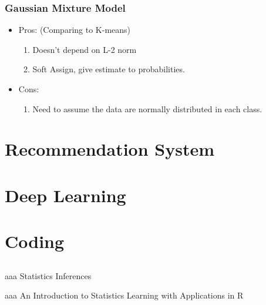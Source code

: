 \documentclass[12pt]{amsart}
\numberwithin{equation}{section}
\theoremstyle{plain}
\theoremstyle{definition}
\begin{document}
\subsubsection{Gaussian Mixture Model}

\begin{itemize}
\item Pros: (Comparing to K-means)

\begin{enumerate}
\item Doesn't depend on L-2 norm
\item Soft Assign, give estimate to probabilities.
\end{enumerate}

\item Cons:

\begin{enumerate}
\item Need to assume the data are normally distributed in each class.
\end{enumerate}

\end{itemize}

\section{Recommendation System}



\section{Deep Learning}


\section{Coding}

\subsection{}

\begin{thebibliography}{}
aaa
\newblock Statistics Inferences
\newblock {\em }

aaa
\newblock An Introduction to Statistics Learning with Applications in R
\newblock {\em }

\end{thebibliography}
\end{document}
